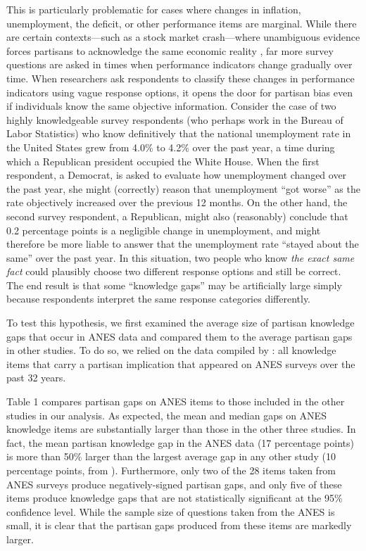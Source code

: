 \documentclass[12pt, letterpaper]{article}
\begin{document}
This is particularly problematic for cases where changes in inflation, unemployment, the deficit, or other performance items are marginal. While there are certain contexts---such as a stock market crash---where unambiguous evidence forces partisans to acknowledge the same economic reality \citep[e.g.][]{bisgaard2015bias,parkerstephen_2013}, far more survey questions are asked in times when performance indicators change gradually over time. When researchers ask respondents to classify these changes in performance indicators using vague response options, it opens the door for partisan bias even if individuals know the same objective information. Consider the case of two highly knowledgeable survey respondents (who perhaps work in the Bureau of Labor Statistics) who know definitively that the national unemployment rate in the United States grew from 4.0\% to 4.2\% over the past year, a time during which a Republican president occupied the White House. When the first respondent, a Democrat, is asked to evaluate how unemployment changed over the past year, she might (correctly) reason that unemployment ``got worse'' as the rate objectively increased over the previous 12 months. On the other hand, the second survey respondent, a Republican, might also (reasonably) conclude that 0.2 percentage points is a negligible change in unemployment, and might therefore be more liable to answer that the unemployment rate  ``stayed about the same'' over the past year. In this situation, two people who know \textit{the exact same fact} could plausibly choose two different response options and still be correct. The end result is that some ``knowledge gaps'' may be artificially large simply because respondents interpret the same response categories differently. 

To test this hypothesis, we first examined the average size of partisan knowledge gaps that occur in ANES data and compared them to the average partisan gaps in other studies. To do so, we relied on the data compiled by \citet{roush_2021}: all knowledge items that carry a partisan implication that appeared on ANES surveys over the past 32 years.

Table 1 compares partisan gaps on ANES items to those included in the other studies in our analysis. As expected, the mean and median gaps on ANES knowledge items are substantially larger than those in the other three studies. In fact, the mean partisan knowledge gap in the ANES data (17 percentage points) is more than 50\% larger than the largest average gap in any other study (10 percentage points, from \citet{bullocketal_2015}). Furthermore, only two of the 28 items taken from ANES surveys produce negatively-signed partisan gaps, and only five of these items produce knowledge gaps that are not statistically significant at the 95\% confidence level. While the sample size of questions taken from the ANES is small, it is clear that the partisan gaps produced from these items are markedly larger.
\end{document}
